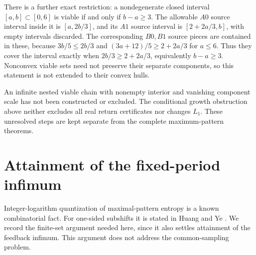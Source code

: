 \documentclass[11pt,reqno]{amsart}
\numberwithin{equation}{section}
\theoremstyle{definition}
\begin{document}
There is a further exact restriction: a nondegenerate closed interval
$[a,b]\subset[0,6]$ is viable if and only if $b-a\ge3$.
The allowable $A0$ source interval inside it is
$[a,2b/3]$, and its $A1$ source interval is
$[2+2a/3,b]$, with empty intervals discarded. The corresponding
$B0,B1$ source pieces are contained in these, because
$3b/5\le2b/3$ and $(3a+12)/5\ge2+2a/3$ for $a\le6$.
Thus they cover the interval exactly when
$2b/3\ge2+2a/3$, equivalently $b-a\ge3$.
Nonconvex viable sets need not preserve their separate components,
so this statement is not extended to their convex hulls.

An infinite nested viable chain with nonempty interior and vanishing
component scale has not been constructed or excluded. The conditional
growth obstruction above neither excludes all real return certificates
nor changes $L_1$. These unresolved steps are kept separate from
the complete maximum-pattern theorems.

\section{Attainment of the fixed-period infimum}\label{app:minimum}

Integer-logarithm quantization of maximal-pattern entropy is a known
combinatorial fact. For one-sided subshifts it is stated in
Huang and Ye \cite[Theorem~5.5]{HuangYe2009}. We record the finite-set
argument needed here, since it also settles attainment of the feedback
infimum. This argument does not address the common-sampling problem.
\end{document}

